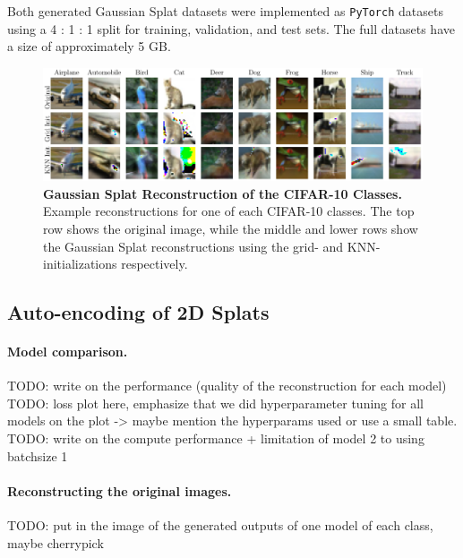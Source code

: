 Both generated Gaussian Splat datasets were implemented as \texttt{PyTorch} datasets using a 4 : 1 : 1 split for training, validation, and test sets. The full datasets have a size of approximately 5 GB.

\begin{figure}
    \centering
    \includegraphics[width=1\linewidth]{fig/splat_reconstruction_comparison.pdf}
    \caption{\textbf{Gaussian Splat Reconstruction of the CIFAR-10 Classes.} Example reconstructions for one of each CIFAR-10 classes. The top row shows the original image, while the middle and lower rows show the Gaussian Splat reconstructions using the grid- and KNN-initializations respectively.}
    \label{fig:splat-reconstructions}
\end{figure}

\subsection{Auto-encoding of 2D Splats}
\paragraph{Model comparison.} TODO: write on the performance (quality of the reconstruction for each model)
TODO: loss plot here, emphasize that we did hyperparameter tuning for all models on the plot  -> maybe mention the hyperparams used or use a small table.
TODO: write on the compute performance + limitation of model 2 to using batchsize 1

\paragraph{Reconstructing the original images.}
TODO: put in the image of the generated outputs of one model of each class, maybe cherrypick